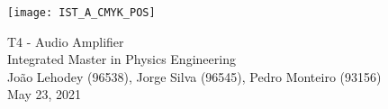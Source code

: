 
\thispagestyle {empty}

\texttt{[image: IST\_A\_CMYK\_POS]}

\begin{center}
%
\vspace{1.0cm}

\vspace{1cm}
{\FontLb T4 - Audio Amplifier} \\ %
\vspace{1cm}
{\FontSn Integrated Master in Physics Engineering} \\ %
\vspace{1cm}
{\FontSn João Lehodey (96538), Jorge Silva (96545), Pedro Monteiro (93156)} \\
\vspace{1cm}
{\FontSn May 23, 2021} \\ %
%
\end{center}

